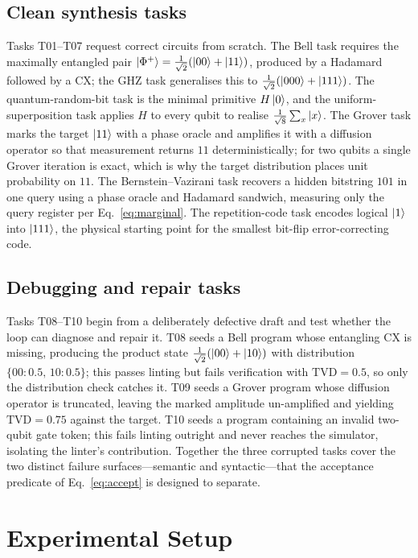 \documentclass[11pt,a4paper]{article}
\newcommand{\tvd}{\mathrm{TVD}}
\begin{document}
\subsection{Clean synthesis tasks}
Tasks T01--T07 request correct circuits from scratch. The Bell task requires the maximally entangled pair $\ket{\Phi^{+}}=\tfrac{1}{\sqrt2}(\ket{00}+\ket{11})$, produced by a Hadamard followed by a $\mathrm{CX}$; the GHZ task generalises this to $\tfrac{1}{\sqrt2}(\ket{000}+\ket{111})$. The quantum-random-bit task is the minimal primitive $H\ket{0}$, and the uniform-superposition task applies $H$ to every qubit to realise $\tfrac{1}{\sqrt8}\sum_{x}\ket{x}$. The Grover task marks the target $\ket{11}$ with a phase oracle and amplifies it with a diffusion operator so that measurement returns $11$ deterministically; for two qubits a single Grover iteration is exact, which is why the target distribution places unit probability on $11$. The Bernstein--Vazirani task recovers a hidden bitstring $101$ in one query using a phase oracle and Hadamard sandwich, measuring only the query register per Eq.~\eqref{eq:marginal}. The repetition-code task encodes logical $\ket{1}$ into $\ket{111}$, the physical starting point for the smallest bit-flip error-correcting code.

\subsection{Debugging and repair tasks}
Tasks T08--T10 begin from a deliberately defective draft and test whether the loop can diagnose and repair it. T08 seeds a Bell program whose entangling $\mathrm{CX}$ is missing, producing the product state $\tfrac{1}{\sqrt2}(\ket{00}+\ket{10})$ with distribution $\{00\!:\!0.5,\,10\!:\!0.5\}$; this passes linting but fails verification with $\tvd=0.5$, so only the distribution check catches it. T09 seeds a Grover program whose diffusion operator is truncated, leaving the marked amplitude un-amplified and yielding $\tvd=0.75$ against the target. T10 seeds a program containing an invalid two-qubit gate token; this fails linting outright and never reaches the simulator, isolating the linter's contribution. Together the three corrupted tasks cover the two distinct failure surfaces---semantic and syntactic---that the acceptance predicate of Eq.~\eqref{eq:accept} is designed to separate.

\section{Experimental Setup}
\label{sec:setup}
\end{document}
